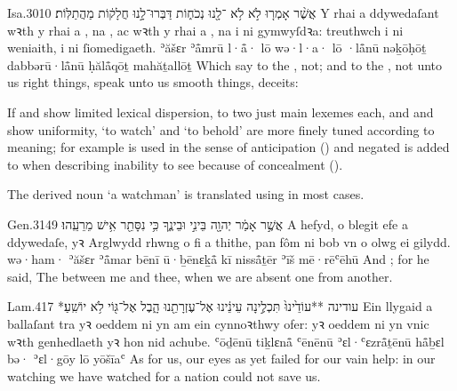 \begin{example}{Isa.}{30}{10}{}{}
	\quoling
	{אֲשֶׁ֨ר אָמְר֤וּ  לֹ֣א   לֹ֥א ־לָ֖נוּ נְכֹח֑וֹת דַּבְּרוּ־לָ֣נוּ חֲלָק֔וֹת  מַהֲתַלּֽוֹת׃}
	{Y rhai a ddywedaſant wꝛth y rhai a , na , ac wꝛth y rhai a , na  i ni gymwyſdꝛa: treuthwch i ni weniaith,  i ni ſiomedigaeth.}
	{ʾăšɛr ʾå̄mrū l·å̄· lō  wə·l·a· lō ·lå̄nū nəḵōḥōṯ dabbərū·lå̄nū ḥălå̄qōṯ  mahăṯallōṯ}
	{Which say to the ,  not; and to the ,  not unto us right things, speak unto us smooth things,  deceits:}
\end{example}




\begin{paper}
	{\click} If  and  show limited lexical dispersion, to two just main lexemes each, and  and  show uniformity,  ‘to watch’ and  ‘to behold’ are more finely tuned according to meaning; for example  is used in the sense of anticipation () and negated  is added to  when describing inability to see because of concealment ().

	The derived noun  ‘a watchman’ is translated using  in most cases.
\end{paper}

\begin{example}{Gen.}{31}{49}{}{}
	\quoling
	{ אֲשֶׁ֣ר אָמַ֔ר  יְהוָ֖ה בֵּינִ֣י וּבֵינֶ֑ךָ כִּ֥י נִסָּתֵ֖ר אִ֥ישׁ מֵרֵעֵֽהוּ׃}
	{A  hefyd, o blegit efe a ddywedaſe,  yꝛ Arglwydd rhwng o fi a thithe, pan fôm ni bob vn o olwg ei gilydd.}
	{wə·ham· ʾăšɛr ʾå̄mar  {\YHWH} bēnī ū·ḇēnɛḵå̄ kī nisså̄ṯēr ʾīš mē·rēʿēhū}
	{And ; for he said, The {\LORD}  between me and thee, when we are absent one from another.}
\end{example}

\begin{example}{Lam.}{4}{17}{}{}
	\quoling
	{*עודינה **עוֹדֵ֙ינוּ֙ תִּכְלֶ֣ינָה עֵינֵ֔ינוּ אֶל־עֶזְרָתֵ֖נוּ הָ֑בֶל   אֶל־גּ֖וֹי לֹ֥א יוֹשִֽׁעַ׃}
	{Ein llygaid a ballaſant tra yꝛ oeddem ni yn  am ein cynnoꝛthwy ofer:  yꝛ oeddem ni yn vnic wꝛth genhedlaeth yꝛ hon nid achube.}
	{ʿōḏēnū tiḵlɛnå̄ ʿēnēnū ʾɛl·ʿɛzrå̄ṯēnū hå̄ḇɛl bə·  ʾɛl·gōy lō yōšīaʿ}
	{As for us, our eyes as yet failed for our vain help: in our watching we have watched for a nation  could not save us.}
\end{example}

